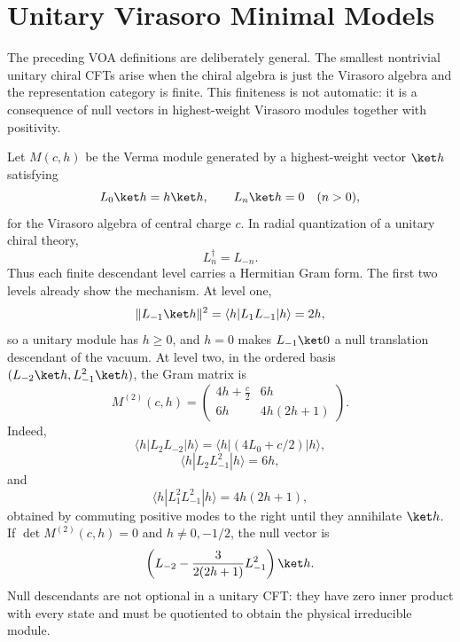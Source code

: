 \section{Unitary Virasoro Minimal Models}
\label{sec:unitary-virasoro-minimal-models}

The preceding VOA definitions are deliberately general.  The smallest
nontrivial unitary chiral CFTs arise when the chiral algebra is just the
Virasoro algebra and the representation category is finite.  This finiteness
is not automatic: it is a consequence of null vectors in highest-weight
Virasoro modules together with positivity.

Let \(M(c,h)\) be the Verma module generated by a highest-weight vector
\(\ket h\) satisfying
\[
  L_0\ket h=h\ket h,\qquad L_n\ket h=0\quad(n>0),
\]
for the Virasoro algebra of central charge \(c\).  In radial quantization of
a unitary chiral theory,
\[
  L_n^\dagger=L_{-n}.
\]
Thus each finite descendant level carries a Hermitian Gram form.  The first
two levels already show the mechanism.  At level one,
\[
  \|L_{-1}\ket h\|^2
  =
  \langle h|L_1L_{-1}|h\rangle
  =
  2h,
\]
so a unitary module has \(h\ge0\), and \(h=0\) makes \(L_{-1}\ket0\) a null
translation descendant of the vacuum.  At level two, in the ordered basis
\((L_{-2}\ket h,L_{-1}^2\ket h)\), the Gram matrix is
\begin{equation}
  M^{(2)}(c,h)
  =
  \begin{pmatrix}
    4h+\frac c2 & 6h\\
    6h & 4h(2h+1)
  \end{pmatrix}.
  \label{eq:virasoro-level-two-gram}
\end{equation}
Indeed,
\[
  \langle h|L_2L_{-2}|h\rangle
  =
  \langle h|(4L_0+c/2)|h\rangle,
\]
\[
  \langle h|L_2L_{-1}^2|h\rangle
  =
  6h,
\]
and
\[
  \langle h|L_1^2L_{-1}^2|h\rangle
  =
  4h(2h+1),
\]
obtained by commuting positive modes to the right until they annihilate
\(\ket h\).  If \(\det M^{(2)}(c,h)=0\) and \(h\ne0,-1/2\), the null vector is
\begin{equation}
  \left(
    L_{-2}-\frac{3}{2(2h+1)}L_{-1}^2
  \right)\ket h.
  \label{eq:level-two-virasoro-null-vector}
\end{equation}
Null descendants are not optional in a unitary CFT: they have zero inner
product with every state and must be quotiented to obtain the physical
irreducible module.


